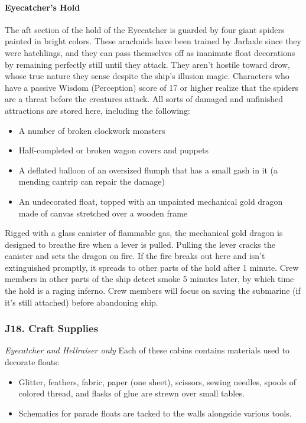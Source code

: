 \documentclass[10pt,a4paper,twoside,twocolumn,openany,nodeprecatedcode]{dndbook}
\begin{document}
\paragraph{Eyecatcher's Hold}
The aft section of the hold of the Eyecatcher is guarded by four giant spiders painted in bright colors. These arachnids have been trained by Jarlaxle since they were hatchlings, and they can pass themselves off as inanimate float decorations by remaining perfectly still until they attack. They aren't hostile toward drow, whose true nature they sense despite the ship's illusion magic. Characters who have a passive Wisdom (Perception) score of 17 or higher realize that the spiders are a threat before the creatures attack.
All sorts of damaged and unfinished attractions are stored here, including the following:
\begin{itemize}

\item A number of broken clockwork monsters
\item Half-completed or broken wagon covers and puppets
\item A deflated balloon of an oversized flumph that has a small gash in it (a mending cantrip can repair the damage)
\item An undecorated float, topped with an unpainted mechanical gold dragon made of canvas stretched over a wooden frame
\end{itemize}


Rigged with a glass canister of flammable gas, the mechanical gold dragon is designed to breathe fire when a lever is pulled. Pulling the lever cracks the canister and sets the dragon on fire. If the fire breaks out here and isn't extinguished promptly, it spreads to other parts of the hold after 1 minute. Crew members in other parts of the ship detect smoke 5 minutes later, by which time the hold is a raging inferno. Crew members will focus on saving the submarine (if it's still attached) before abandoning ship.
\subsubsection{J18. Craft Supplies}
\textit{Eyecatcher and Hellraiser only}
Each of these cabins contains materials used to decorate floats:
\begin{itemize}

\item Glitter, feathers, fabric, paper (one sheet), scissors, sewing needles, spools of colored thread, and flasks of glue are strewn over small tables.
\item Schematics for parade floats are tacked to the walls alongside various tools.
\end{itemize}
\end{document}
